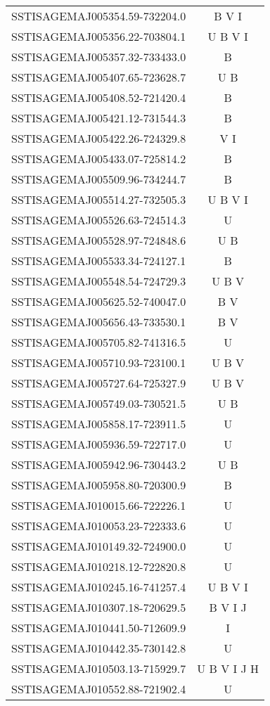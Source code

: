 \documentclass[useAMS,usenatbib]{mn2e/mn2e}
\begin{document}
{\begin{table*}
\begin{tabular}{c c}
SSTISAGEMAJ005354.59-732204.0& B V I\\
SSTISAGEMAJ005356.22-703804.1& U B V I\\
SSTISAGEMAJ005357.32-733433.0& B\\
SSTISAGEMAJ005407.65-723628.7& U B\\
SSTISAGEMAJ005408.52-721420.4& B\\
SSTISAGEMAJ005421.12-731544.3& B\\
SSTISAGEMAJ005422.26-724329.8& V I\\
SSTISAGEMAJ005433.07-725814.2& B\\
SSTISAGEMAJ005509.96-734244.7& B\\
SSTISAGEMAJ005514.27-732505.3& U B V I\\
SSTISAGEMAJ005526.63-724514.3& U\\
SSTISAGEMAJ005528.97-724848.6& U B\\
SSTISAGEMAJ005533.34-724127.1& B\\
SSTISAGEMAJ005548.54-724729.3& U B V\\
SSTISAGEMAJ005625.52-740047.0& B V\\
SSTISAGEMAJ005656.43-733530.1& B V\\
SSTISAGEMAJ005705.82-741316.5& U\\
SSTISAGEMAJ005710.93-723100.1& U B V\\
SSTISAGEMAJ005727.64-725327.9& U B V\\
SSTISAGEMAJ005749.03-730521.5& U B\\
SSTISAGEMAJ005858.17-723911.5& U\\
SSTISAGEMAJ005936.59-722717.0& U\\
SSTISAGEMAJ005942.96-730443.2& U B\\
SSTISAGEMAJ005958.80-720300.9& B\\
SSTISAGEMAJ010015.66-722226.1& U\\
SSTISAGEMAJ010053.23-722333.6& U\\
SSTISAGEMAJ010149.32-724900.0& U\\
SSTISAGEMAJ010218.12-722820.8& U\\
SSTISAGEMAJ010245.16-741257.4& U B V I\\
SSTISAGEMAJ010307.18-720629.5& B V I J\\
SSTISAGEMAJ010441.50-712609.9& I\\
SSTISAGEMAJ010442.35-730142.8& U\\
SSTISAGEMAJ010503.13-715929.7& U B V I J H\\
SSTISAGEMAJ010552.88-721902.4& U\\

\end{tabular}
\end{table*}}
\end{document}
